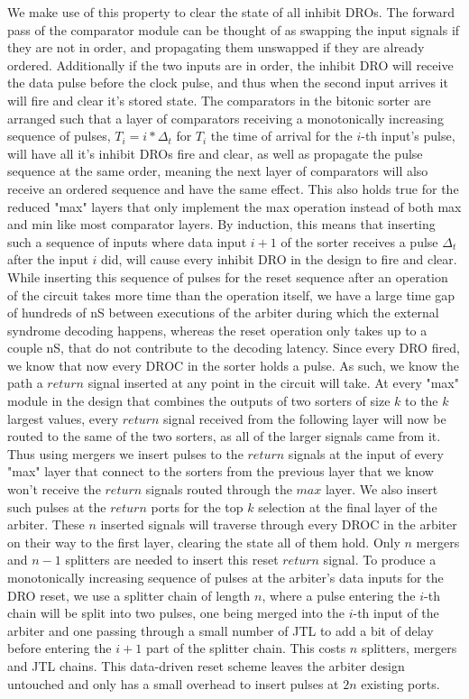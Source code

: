 \documentclass[conference]{IEEEtran}
\begin{document}
We make use of this property to clear the state of all inhibit DROs.
The forward pass of the comparator module can be thought of as swapping the input signals if they are not in order, and propagating them unswapped if they are already ordered.
Additionally if the two inputs are in order, the inhibit DRO will receive the data pulse before the clock pulse, and thus when the second input arrives it will fire and clear it's stored state.
The comparators in the bitonic sorter are arranged such that a layer of comparators receiving a monotonically increasing sequence of pulses, $T_i = i * {\Delta}_t$ for $T_i$ the time of arrival for the $i$-th input's pulse, will have all it's inhibit DROs fire and clear, as well as propagate the pulse sequence at the same order, meaning the next layer of comparators will also receive an ordered sequence and have the same effect.
This also holds true for the reduced "max" layers that only implement the max operation instead of both max and min like most comparator layers.
By induction, this means that inserting such a sequence of inputs where data input $i+1$ of the sorter receives a pulse ${\Delta}_t$ after the input $i$ did, will cause every inhibit DRO in the design to fire and clear.
While inserting this sequence of pulses for the reset sequence after an operation of the circuit takes more time than the operation itself, we have a large time gap of hundreds of nS between executions of the arbiter during which the external syndrome decoding happens, whereas the reset operation only takes up to a couple nS, that do not contribute to the decoding latency.
Since every DRO fired, we know that now every DROC in the sorter holds a pulse.
As such, we know the path a $return$ signal inserted at any point in the circuit will take.
At every "max" module in the design that combines the outputs of two sorters of size $k$ to the $k$ largest values, every $return$ signal received from the following layer will now be routed to the same of the two sorters, as all of the larger signals came from it.
Thus using mergers we insert pulses to the $return$ signals at the input of every "max" layer that connect to the sorters from the previous layer that we know won't receive the $return$ signals routed through the $max$ layer.
We also insert such pulses at the $return$ ports for the top $k$ selection at the final layer of the arbiter.
These $n$ inserted signals will traverse through every DROC in the arbiter on their way to the first layer, clearing the state all of them hold.
Only $n$ mergers and $n-1$ splitters are needed to insert this reset $return$ signal.
To produce a monotonically increasing sequence of pulses at the arbiter's data inputs for the DRO reset, we use a splitter chain of length $n$, where a pulse entering the $i$-th chain will be split into two pulses, one being merged into the $i$-th input of the arbiter and one passing through a small number of JTL to add a bit of delay before entering the $i+1$ part of the splitter chain.
This costs $n$ splitters, mergers and JTL chains.
This data-driven reset scheme leaves the arbiter design untouched and only has a small overhead to insert pulses at $2n$ existing ports.
\end{document}
